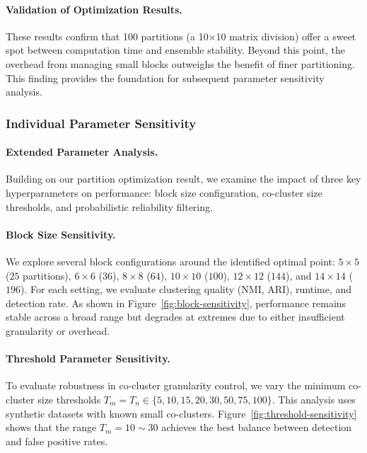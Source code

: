 \documentclass[journal]{IEEEtran}
\begin{document}
{        \paragraph{Validation of Optimization Results.}
        These results confirm that 100 partitions (a 10×10 matrix division) offer a sweet spot between computation time and ensemble stability. Beyond this point, the overhead from managing small blocks outweighs the benefit of finer partitioning. This finding provides the foundation for subsequent parameter sensitivity analysis.

        \subsubsection{Individual Parameter Sensitivity}

        \paragraph{Extended Parameter Analysis.}
        Building on our partition optimization result, we examine the impact of three key hyperparameters on performance: block size configuration, co-cluster size thresholds, and probabilistic reliability filtering.

        \paragraph{Block Size Sensitivity.}
        We explore several block configurations around the identified optimal point: $5 \times 5$ ($25$ partitions), $6 \times 6$ ($36$), $8 \times 8$ ($64$), $10 \times 10$ ($100$), $12 \times 12$ ($144$), and $14 \times 14$ ($196$). For each setting, we evaluate clustering quality (NMI, ARI), runtime, and detection rate. As shown in Figure~\ref{fig:block-sensitivity}, performance remains stable across a broad range but degrades at extremes due to either insufficient granularity or overhead.

        \paragraph{Threshold Parameter Sensitivity.}
        To evaluate robustness in co-cluster granularity control, we vary the minimum co-cluster size thresholds \( T_m = T_n \in \{5, 10, 15, 20, 30, 50, 75, 100\} \). This analysis uses synthetic datasets with known small co-clusters. Figure~\ref{fig:threshold-sensitivity} shows that the range \( T_m = 10 \sim 30 \) achieves the best balance between detection and false positive rates.

}
\end{document}
